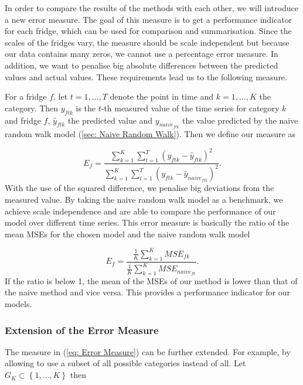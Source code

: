 In order to compare the results of the methods with each other, we will introduce a new error measure. The goal of this measure is to get a performance indicator for each fridge, which can be used for comparison and summarisation. Since the scales of the fridges vary, the measure should be scale independent but because our data contains many zeros, we cannot use a percentage error measure. In addition, we want to penalise big absolute differences between the predicted values and actual values. These requirements lead us to the following measure.

For a fridge $f$, let $t = 1,\ldots,T$ denote the point in time and $k=1,\ldots,K$ the category. Then $y_{ftk}$ is the $t$-th measured value of the time series for category $k$ and fridge $f$, $\hat{y}_{ftk}$ the predicted value and $y_{naive_{ftk}}$ the value predicted by the naive random walk model (\ref{sec: Naive Random Walk}). Then we define our measure as

\begin{equation}
E_f=\frac{\sum_{k=1}^{K}\sum_{t=1}^T(y_{ftk}-\hat{y}_{ftk})^2}{\sum_{k=1}^{K}\sum_{t=1}^T(y_{ftk}-\hat{y}_{naive_{ftk}})^2}.
\label{eq: Error Measure}
\end{equation}
%
With the use of the squared difference, we penalise big deviations from the measured value. By taking the naive random walk model as a benchmark, we achieve scale independence and are able to compare the performance of our model over different time series. This error measure is basically the ratio of the mean MSEs for the chosen model and the naive random walk model

\begin{equation}
E_f=\frac{\frac{1}{K}\sum_{k=1}^K MSE_{fk}}{\frac{1}{K}\sum_{k=1}^K MSE_{naive_{fk}}}.
\label{eq: Error Measure MSE}
\end{equation}
%
If the ratio is below 1, the mean of the MSEs of our method is lower than that of the naive method and vice versa. This provides a performance indicator for our models. 

\subsubsection{Extension of the Error Measure}
\label{sec:Error Measure Extension}

The measure in (\ref{eq: Error Measure}) can be further extended. For example, by allowing to use a subset of all possible categories instead of all. Let $G_K \subset \left\{1,\ldots,K\right\}$ then

